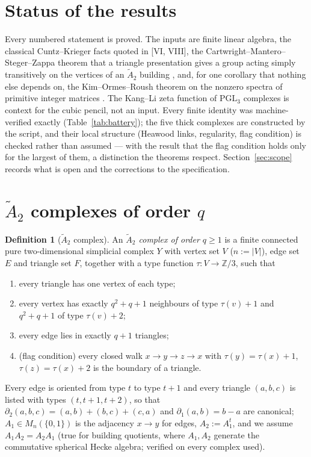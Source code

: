 \documentclass[11pt]{amsart}
\numberwithin{equation}{section}
\theoremstyle{definition}
\newtheorem{definition}[theorem]{Definition}
\theoremstyle{remark}
\newcommand{\Z}{\mathbb{Z}}
\newcommand{\PGL}{\mathrm{PGL}}
\newcommand{\Atwo}{\widetilde A_2}
\begin{document}
\maketitle

\section*{Status of the results}

Every numbered statement is proved. The inputs are finite linear algebra, the classical
Cuntz--Krieger facts quoted in [VI, VIII], the Cartwright--Mantero--Steger--Zappa theorem
that a triangle presentation gives a group acting simply transitively on the vertices of an
$\Atwo$ building \cite{CMSZ}, and, for one corollary that nothing else depends on, the
Kim--Ormes--Roush theorem on the nonzero spectra of primitive integer matrices \cite{KOR}.
The Kang--Li zeta function of $\PGL_3$ complexes \cite{KL} is context for the cubic pencil,
not an input. Every finite identity was machine-verified exactly (Table~\ref{tab:battery});
the five thick complexes are constructed by the script, and their local structure (Heawood
links, regularity, flag condition) is checked rather than assumed --- with the result that
the flag condition holds only for the largest of them, a distinction the theorems respect. Section~\ref{sec:scope}
records what is open and the corrections to the specification.

\section{\texorpdfstring{$\Atwo$ complexes of order $q$}{A2 complexes of order q}}\label{sec:complexes}

\begin{definition}[$\Atwo$ complex]\label{def:a2}
An \emph{$\Atwo$ complex of order $q\ge1$} is a finite connected pure two-dimensional
simplicial complex $Y$ with vertex set $V$ ($n:=|V|$), edge set $E$ and triangle set $F$,
together with a type function $\tau\colon V\to\Z/3$, such that
\begin{enumerate}
\item[(i)] every triangle has one vertex of each type;
\item[(ii)] every vertex has exactly $q^{2}+q+1$ neighbours of type $\tau(v)+1$ and
$q^{2}+q+1$ of type $\tau(v)+2$;
\item[(iii)] every edge lies in exactly $q+1$ triangles;
\item[(iv)] (flag condition) every closed walk $x\to y\to z\to x$ with
$\tau(y)=\tau(x)+1$, $\tau(z)=\tau(x)+2$ is the boundary of a triangle.
\end{enumerate}
Every edge is oriented from type $t$ to type $t+1$ and every triangle $(a,b,c)$ is listed
with types $(t,t+1,t+2)$, so that $\partial_2(a,b,c)=(a,b)+(b,c)+(c,a)$ and
$\partial_1(a,b)=b-a$ are canonical; $A_1\in M_n(\{0,1\})$ is the adjacency $x\to y$ for
edges, $A_2:=A_1^{t}$, and we assume $A_1A_2=A_2A_1$ (true for building quotients, where
$A_1,A_2$ generate the commutative spherical Hecke algebra; verified on every complex used).
\end{definition}
\end{document}
